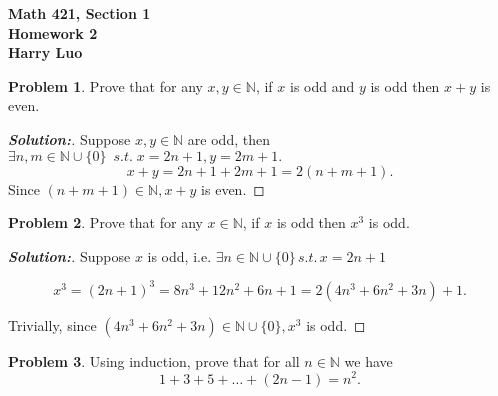 \documentclass[12pt]{article}
\theoremstyle{definition}\newtheorem{problem}{Problem}
\newenvironment{solution}{\begin{proof}[\bfseries\textup{Solution:}]}{\end{proof}}
\begin{document}

\begin{center}
\bfseries Math 421, Section 1 
\\ 
Homework 2
\\ 
Harry Luo %
\\ [24pt] 
\end{center}

\begin{problem}
Prove that for any $x,y\in\mathbb{N}$, if $x$ is odd and $y$ is odd then $x+y$ is even.
\end{problem}


\begin{solution} 
    Suppose $ x, y \in \mathbb{N} $ are odd, then $ \exists n, m \in \mathbb{N} \cup \{0\} \ \; s.t. \; x = 2n+1, y = 2m+1. $ 
    \begin{equation}
         x+y = 2 n + 1 + 2 m + 1 = 2(n + m + 1). 
    \end{equation}  
    Since $ (n + m + 1) \in \mathbb{N}, x+y $ is even.  
\end{solution}


\newpage
\begin{problem}
Prove that for any $x\in\mathbb{N}$, if $x$ is odd then $x^3$ is odd.
\end{problem}

\begin{solution}


Suppose $ x  $ is odd, i.e. $ \exists n \in \mathbb{N} \cup \{0\} \, s.t.\, x=2n+1$ 

\begin{equation} x^3 = (2n+1)^3 = 8n^3 + 12n^2 + 6n + 1 = 2(4n^3 + 6n^2 + 3n) + 1. \end{equation} 

    Trivially, since $ (4n^3 + 6n^2 + 3n) \in \mathbb{N} \cup \{0\}, x^3 $ is odd.

\end{solution} 



\newpage
\begin{problem}
Using induction, prove that for all $n\in\mathbb{N}$ we have
\begin{equation*}
1+3+5+\dots+(2n-1) = n^2 .
\end{equation*}
\end{problem}
\end{document}

